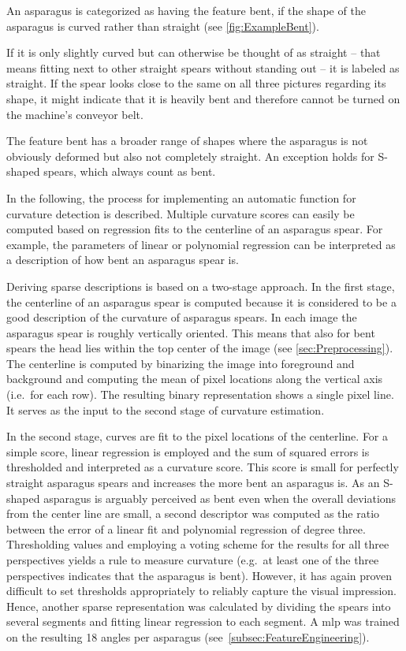 \bigskip
An asparagus is categorized as having the feature bent, if the shape of the asparagus is curved rather than straight (see \autoref{fig:ExampleBent}). 

If it is only slightly curved but can otherwise be thought of as straight -- that means fitting next to other straight spears without standing out -- it is labeled as straight. If the spear looks close to the same on all three pictures regarding its shape, it might indicate that it is heavily bent and therefore cannot be turned on the machine’s conveyor belt.

The feature bent has a broader range of shapes where the asparagus is not obviously deformed but also not completely straight. An exception holds for S-shaped spears, which always count as bent.

\bigskip
In the following, the process for implementing an automatic function for curvature detection is described.
Multiple curvature scores can easily be computed based on regression fits to the centerline of an asparagus spear. For example, the parameters of linear or polynomial regression can be interpreted as a description of how bent an asparagus spear is. 

\bigskip
Deriving sparse descriptions is based on a two-stage approach. In the first stage, the centerline of an asparagus spear is computed because it is considered to be a good description of the curvature of asparagus spears. In each image the asparagus spear is roughly vertically oriented. This means that also for bent spears the head lies within the top center of the image (see \autoref{sec:Preprocessing}). The centerline is computed by binarizing the image into foreground and background and computing the mean of pixel locations along the vertical axis (i.e.\ for each row). The resulting binary representation shows a single pixel line. It serves as the input to the second stage of curvature estimation.

In the second stage, curves are fit to the pixel locations of the centerline. For a simple score, linear regression is employed and the sum of squared errors is thresholded and interpreted as a curvature score. This score is small for perfectly straight asparagus spears and increases the more bent an asparagus is. As an S-shaped asparagus is arguably perceived as bent even when the overall deviations from the center line are small, a second descriptor was computed as the ratio between the error of a linear fit and polynomial regression of degree three. Thresholding values and employing a voting scheme for the results for all three perspectives yields a rule to measure curvature (e.g.\ at least one of the three perspectives indicates that the asparagus is bent). However, it has again proven difficult to set thresholds appropriately to reliably capture the visual impression. Hence, another sparse representation was calculated by dividing the spears into several segments and fitting linear regression to each segment. A \acrfull{mlp} was trained on the resulting 18 angles per asparagus (see~\autoref{subsec:FeatureEngineering}).

